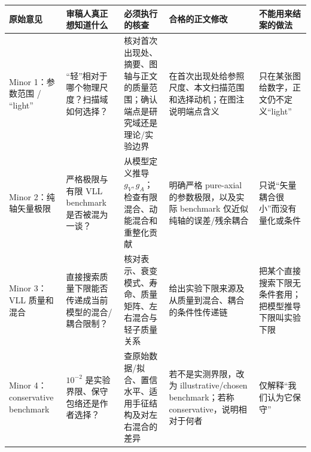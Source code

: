 \documentclass[
  chinese,
  UTF8]{ctexart}
\newcounter{none} %
\begin{document}
{\def\LTcaptype{none} %
\begin{longtable}[]{@{}
  >{\raggedright\arraybackslash}p{}
  >{\raggedright\arraybackslash}p{}
  >{\raggedright\arraybackslash}p{}
  >{\raggedright\arraybackslash}p{}
  >{\raggedright\arraybackslash}p{}@{}}
\toprule\noalign{}
\begin{minipage}[b]{\linewidth}\raggedright
原始意见
\end{minipage} & \begin{minipage}[b]{\linewidth}\raggedright
审稿人真正想知道什么
\end{minipage} & \begin{minipage}[b]{\linewidth}\raggedright
必须执行的核查
\end{minipage} & \begin{minipage}[b]{\linewidth}\raggedright
合格的正文修改
\end{minipage} & \begin{minipage}[b]{\linewidth}\raggedright
不能用来结案的做法
\end{minipage} \\
\midrule\noalign{}
\endhead
\bottomrule\noalign{}
\endlastfoot
Minor 1：参数范围 / ``light'' &
``轻''相对于哪个物理尺度？扫描域如何选择？ &
核对首次出现处、摘要、图轴与正文的质量范围；确认端点是研究域还是理论/实验边界
& 在首次出现处给参照尺度、本文扫描范围和选择动机；在图注说明端点含义 &
只在某张图给数字，正文仍不定义``light'' \\
Minor 2：纯轴矢量极限 & 严格极限与有限 VLL benchmark 是否被混为一谈？ &
从模型定义推导 \(g_V,g_A\)；检查有限混合、动能混合和重整化贡献 &
明确严格 pure-axial 的参数极限，以及实际 benchmark
仅近似纯轴的误差/残余耦合 & 只说``矢量耦合很小''而没有量化或条件 \\
Minor 3：VLL 质量和混合 &
直接搜索质量下限能否传递成当前模型的混合/耦合限制？ &
核对表示、衰变模式、寿命、质量矩阵、左右混合与轻子质量关系 &
给出实验下限来源及从质量到混合、耦合的条件性传递链 &
把某个直接搜索下限无条件套用；把模型推导下限叫实验下限 \\
Minor 4：conservative benchmark & \(10^{-2}\)
是实验界限、保守包络还是作者选择？ &
查原始数据/拟合、置信水平、适用手征结构及对左右混合的差异 &
若不是实测界限，改为 illustrative/chosen benchmark；若称
conservative，说明相对于何者 & 仅解释``我们认为它保守'' \\

\end{longtable}}
\end{document}
